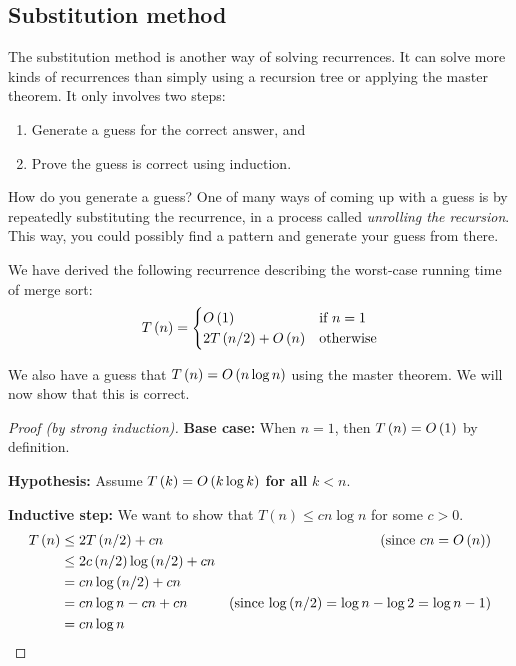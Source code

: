 \subsection{Substitution method}
The substitution method is another way of solving recurrences. It can solve more kinds of recurrences than simply using a recursion tree or applying the master theorem. It only involves two steps:
\begin{enumerate}
    \item Generate a guess for the correct answer, and
    \item Prove the guess is correct using induction.
\end{enumerate}

How do you generate a guess? One of many ways of coming up with a guess is by repeatedly substituting the recurrence, in a process called \textit{unrolling the recursion}. This way, you could possibly find a pattern and generate your guess from there.

\begin{example}
We have derived the following recurrence describing the worst-case running time of merge sort:
\[
T\left(n\right) = \begin{cases}
    O\left(1 \right) & \text{if $n = 1$}\\
    2 T\left(n/2\right) + O\left(n \right) & \text{otherwise}
\end{cases}
\]

We also have a guess that $T\left(n\right) = O\left(n \log n \right)$ using the master theorem. We will now show that this is correct.

\begin{proof}[Proof (by strong induction)]
\textbf{Base case:} When $n=1$, then $T\left(n\right) = O\left(1 \right)$ by definition.

\textbf{Hypothesis:} Assume $T\left(k\right) = O\left(k \log k \right)$ \textbf{for all} $k < n$.

\textbf{Inductive step:} We want to show that $T\left(n\right) \le cn\log n$ for some $c > 0$.
\begin{align*}
    T\left(n\right) &\le 2 T\left(n/2\right) + cn & \text{(since $cn = O\left(n \right)$)}\\
     &\le 2 c\left(n/2\right) \log\left(n/2\right) + cn \\
     &= cn \log\left(n/2\right) + cn \\
     &= cn \log n - cn + cn & \text{(since $\log\left(n/2\right) = \log n - \log 2 = \log n - 1$)}\\
     &= cn \log n
\end{align*}
\end{proof}
\end{example}

